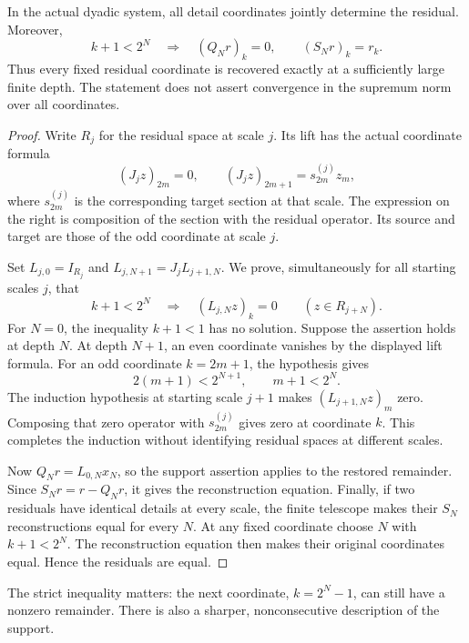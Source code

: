 \begin{theorem}\label{KS28}
In the actual dyadic system, all detail coordinates jointly determine the residual. Moreover,
\[
 k+1<2^N\quad\Longrightarrow\quad
 (Q_Nr)_k=0,\qquad(S_Nr)_k=r_k.
\]
Thus every fixed residual coordinate is recovered exactly at a sufficiently large finite depth. The statement does not assert convergence in the supremum norm over all coordinates.
\end{theorem}
\begin{proof}
Write \(R_j\) for the residual space at scale \(j\). Its lift has the actual coordinate formula
\[
 (J_jz)_{2m}=0,\qquad (J_jz)_{2m+1}=s^{(j)}_{2m}z_m,
\]
where \(s^{(j)}_{2m}\) is the corresponding target section at that scale. The expression on the right is composition of the section with the residual operator. Its source and target are those of the odd coordinate at scale \(j\).

Set \(L_{j,0}=I_{R_j}\) and \(L_{j,N+1}=J_jL_{j+1,N}\). We prove, simultaneously for all starting scales \(j\), that
\[
 k+1<2^N\quad\Longrightarrow\quad (L_{j,N}z)_k=0
 \qquad(z\in R_{j+N}).
\]
For \(N=0\), the inequality \(k+1<1\) has no solution. Suppose the assertion holds at depth \(N\). At depth \(N+1\), an even coordinate vanishes by the displayed lift formula. For an odd coordinate \(k=2m+1\), the hypothesis gives
\[
 2(m+1)<2^{N+1},\qquad m+1<2^N.
\]
The induction hypothesis at starting scale \(j+1\) makes \((L_{j+1,N}z)_m\) zero. Composing that zero operator with \(s^{(j)}_{2m}\) gives zero at coordinate \(k\). This completes the induction without identifying residual spaces at different scales.

Now \(Q_Nr=L_{0,N}x_N\), so the support assertion applies to the restored remainder. Since \(S_Nr=r-Q_Nr\), it gives the reconstruction equation. Finally, if two residuals have identical details at every scale, the finite telescope makes their \(S_N\) reconstructions equal for every \(N\). At any fixed coordinate choose \(N\) with \(k+1<2^N\). The reconstruction equation then makes their original coordinates equal. Hence the residuals are equal.
\end{proof}
The strict inequality matters: the next coordinate, \(k=2^N-1\), can still have a nonzero remainder. There is also a sharper, nonconsecutive description of the support.

